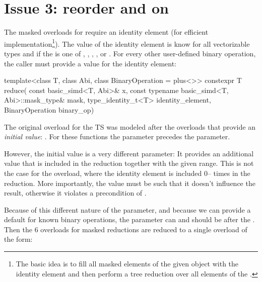 \section{Issue 3: reorder  and  on }

The masked \std{} overloads for  require an identity element (for efficient
implementation\footnote{The basic idea is to fill all masked elements of the given 
object with the identity element and then perform a tree reduction over all elements of the
.}).
The value of the identity element is know for all vectorizable types and if the
 is one of \std{}, \std{}, \std{},
\std{}, or \std{}.
For every other user-defined binary operation, the caller must provide a value for the identity
element:

\begin{wgText}[P1928R11]
  \setcounter{Paras}{0}
  \begin{codeblock}
  template<class T, class Abi, class BinaryOperation = plus<>>
    constexpr T reduce(
      const basic_simd<T, Abi>& x, const typename basic_simd<T, Abi>::mask_type& mask,
      type_identity_t<T> identity_element, BinaryOperation binary_op)
  \end{codeblock}
\end{wgText}

The original  overload for the TS was modeled after the overloads that provide an
\emph{initial value}: .
For these functions the  parameter precedes the  parameter.

However, the initial value is a very different parameter: It provides an additional value that is
included in the reduction together with the given range.
This is not the case for the  overload, where the identity element is included
0-- times in the reduction.
More importantly, the value must be such that it doesn't influence the result, otherwise it violates
a precondition of .

Because of this different nature of the parameter, and because we can provide a default for known
binary operations, the  parameter can and should be after the
.
Then the 6 overloads for masked reductions are reduced to a single overload of the form:

